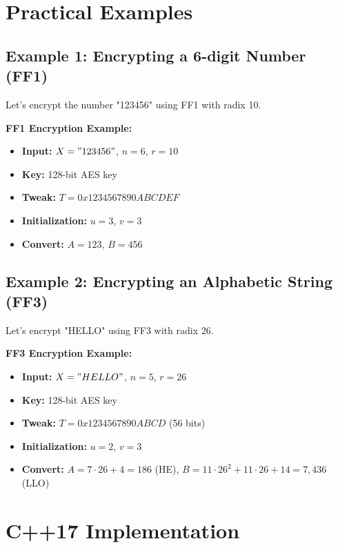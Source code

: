 \documentclass[11pt,a4paper]{article}
\begin{document}
\section{Practical Examples}

\subsection{Example 1: Encrypting a 6-digit Number (FF1)}

Let's encrypt the number "123456" using FF1 with radix 10.

\begin{examplebox}
\textbf{FF1 Encryption Example:}
\begin{itemize}
    \item \textbf{Input:} $X = "123456"$, $n = 6$, $r = 10$
    \item \textbf{Key:} 128-bit AES key
    \item \textbf{Tweak:} $T = 0x1234567890ABCDEF$
    \item \textbf{Initialization:} $u = 3$, $v = 3$
    \item \textbf{Convert:} $A = 123$, $B = 456$
\end{itemize}
\end{examplebox}

\subsection{Example 2: Encrypting an Alphabetic String (FF3)}

Let's encrypt "HELLO" using FF3 with radix 26.

\begin{examplebox}
\textbf{FF3 Encryption Example:}
\begin{itemize}
    \item \textbf{Input:} $X = "HELLO"$, $n = 5$, $r = 26$
    \item \textbf{Key:} 128-bit AES key
    \item \textbf{Tweak:} $T = 0x1234567890ABCD$ (56 bits)
    \item \textbf{Initialization:} $u = 2$, $v = 3$
    \item \textbf{Convert:} $A = 7 \cdot 26 + 4 = 186$ (HE), $B = 11 \cdot 26^2 + 11 \cdot 26 + 14 = 7,436$ (LLO)
\end{itemize}
\end{examplebox}

\section{C++17 Implementation}
\end{document}
